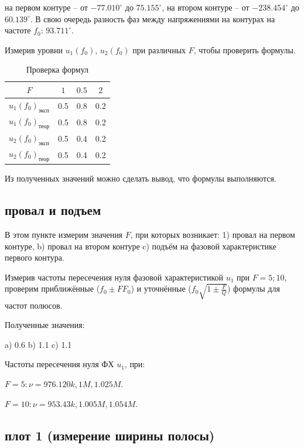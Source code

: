 \documentclass[a4paper, 14pt]{extarticle}%
\begin{document}
\newpage

на первом контуре -- от $-77.010^{\circ}$ до $75.155^{\circ}$, на втором контуре -- от $-238.454^{\circ}$ до $60.139^{\circ}$. В свою очередь разность фаз между напряжениями на контурах на частоте $f_0$: $93.711^{\circ}$.

Измерив уровни $u_1(f_0)$, $u_2(f_0)$ при различных $F$, чтобы проверить формулы.
 

\begin{table}[h]
	\centering
	\begin{tabular}{c|c|c|c}
		$F$                         & $1$ & $0.5$ & $2$ \\ \hline
		$u_1(f_0)_{\text{эксп}}$          & 0.5 & 0.8   & 0.2 \\ \hline
		$u_1(f_0)_{\text{теор}}$ & 0.5 & 0.8   & 0.2 \\ \hline \hline
		$u_2(f_0)_{\text{эксп}}$          & 0.5 & 0.4   & 0.2 \\ \hline
		$u_2(f_0)_{\text{теор}}$ & 0.5 & 0.4   & 0.2 \\ 
	\end{tabular}
	\caption{Проверка формул}
\end{table}

Из полученных значений можно сделать вывод, что формулы выполняются.


\subsection{провал и подъем}

В этом пункте измерим значения $F$, при которых возникает: 1) провал на первом контуре, b) провал на втором контуре c) подъём на фазовой характеристике первого контура.

Измерив частоты пересечения нуля фазовой характеристикой $u_1$ при $F = 5;10$, проверим приближённые ($f_0\pm FF_0$) и уточнённые ($f_0\sqrt{1\pm\frac{F}{Q}}$) формулы для частот полюсов.

Полученные значения:

a) 0.6
b) 1.1
c) 1.1

Частоты пересечения нуля ФХ $u_1$, при:

$F = 5: \nu = 976.120k, 1M, 1.025M$.

$F = 10: \nu = 953.43k, 1.005M, 1.054M$. 

\subsection{плот 1 (измерение ширины полосы)}
\end{document}
